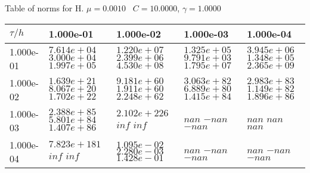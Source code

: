 \begin{center}
Table of norms for H. $\mu = 0.0010$ \, $C = 10.0000$, $\gamma = 1.0000$
  
\begin{tabular}{|p{1in}|p{1in}|p{1in}|p{1in}|p{1in}|} \hline
$\tau / h$ &1.000e-01 &1.000e-02 &1.000e-03 &1.000e-04 \\ \hline 
1.000e-01 & $7.614e+04$  $3.000e+04$  $1.997e+05$  & $1.220e+07$  $2.399e+06$  $4.530e+08$  & $1.325e+05$  $9.791e+03$  $1.795e+07$  & $3.945e+06$  $1.348e+05$  $2.365e+09$  \\ \hline 
1.000e-02 & $1.639e+21$  $8.067e+20$  $1.702e+22$  & $9.181e+60$  $1.911e+60$  $2.248e+62$  & $3.063e+82$  $6.889e+80$  $1.415e+84$  & $2.983e+83$  $1.149e+82$  $1.896e+86$  \\ \hline 
1.000e-03 & $2.388e+85$  $5.801e+84$  $1.407e+86$  & $2.102e+226$  $inf$  $inf$  & $nan$  $-nan$  $-nan$  & $nan$  $nan$  $nan$  \\ \hline 
1.000e-04 & $7.823e+181$  $inf$  $inf$  & $1.095e-02$  $2.280e-03$  $1.428e-01$  & $nan$  $-nan$  $-nan$  & $nan$  $-nan$  $-nan$  \\ \hline 

\end{tabular}\\[20pt]
\end{center}
